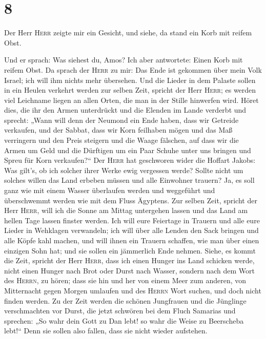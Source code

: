 \hypertarget{section-7}{%
\section{8}\label{section-7}}

 Der Herr \textsc{Herr} zeigte mir ein Gesicht, und siehe,
da stand ein Korb mit reifem Obst.

 Und er sprach: Was siehest du, Amos? Ich aber antwortete:
Einen Korb mit reifem Obst. Da sprach der \textsc{Herr} zu mir: Das Ende
ist gekommen über mein Volk Israel; ich will ihm nichts mehr übersehen.
 Und die Lieder in dem Palaste sollen in ein Heulen
verkehrt werden zur selben Zeit, spricht der Herr \textsc{Herr}; es
werden viel Leichname liegen an allen Orten, die man in der Stille
hinwerfen wird.  Höret dies, die ihr den Armen unterdrückt
und die Elenden im Lande verderbt  und sprecht: „Wann will
denn der Neumond ein Ende haben, dass wir Getreide verkaufen, und der
Sabbat, dass wir Korn feilhaben mögen und das Maß verringern und den
Preis steigern und die Waage fälschen,  auf dass wir die
Armen um Geld und die Dürftigen um ein Paar Schuhe unter uns bringen und
Spreu für Korn verkaufen?{}``  Der \textsc{Herr} hat
geschworen wider die Hoffart Jakobs: Was gilt's, ob ich solcher ihrer
Werke ewig vergessen werde?  Sollte nicht um solches
willen das Land erbeben müssen und alle Einwohner trauern? Ja, es soll
ganz wie mit einem Wasser überlaufen werden und weggeführt und
überschwemmt werden wie mit dem Fluss Ägyptens.  Zur
selben Zeit, spricht der Herr \textsc{Herr}, will ich die Sonne am
Mittag untergehen lassen und das Land am hellen Tage lassen finster
werden.  Ich will eure Feiertage in Trauern und alle eure
Lieder in Wehklagen verwandeln; ich will über alle Lenden den Sack
bringen und alle Köpfe kahl machen, und will ihnen ein Trauern schaffen,
wie man über einen einzigen Sohn hat; und sie sollen ein jämmerlich Ende
nehmen.  Siehe, es kommt die Zeit, spricht der Herr
\textsc{Herr}, dass ich einen Hunger ins Land schicken werde, nicht
einen Hunger nach Brot oder Durst nach Wasser, sondern nach dem Wort des
\textsc{Herrn}, zu hören;  dass sie hin und her von einem
Meer zum anderen, von Mitternacht gegen Morgen umlaufen und des
\textsc{Herrn} Wort suchen, und doch nicht finden werden.
 Zu der Zeit werden die schönen Jungfrauen und die
Jünglinge verschmachten vor Durst,  die jetzt schwören
bei dem Fluch Samarias und sprechen: „So wahr dein Gott zu Dan lebt! so
wahr die Weise zu Beerscheba lebt!{}`` Denn sie sollen also fallen, dass
sie nicht wieder aufstehen.

